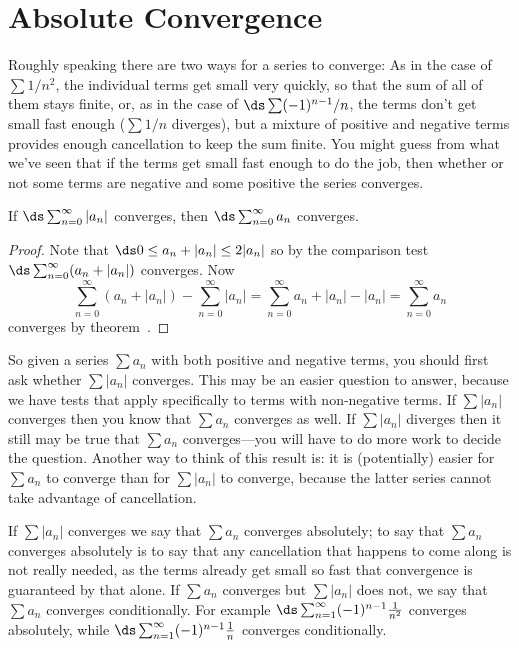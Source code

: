 \section{Absolute Convergence}{}{}
\nobreak
Roughly speaking there are two ways for a series to converge: As in
the case of $\sum 1/n^2$, the individual terms get small very quickly,
so that the sum of all of them stays finite, or, as in the case of
$\ds \sum (-1)^{n-1}/n$, the terms don't get small fast enough ($\sum 1/n$
diverges), but a mixture of positive and negative terms provides
enough cancellation to keep the sum finite. You might guess from what
we've seen that if the terms get small fast enough to do the job, then
whether or not some terms are negative and some positive the series
converges. 

\begin{theorem} If $\ds\sum_{n=0}^\infty |a_n|$ converges, then 
$\ds\sum_{n=0}^\infty a_n$ converges.
\begin{proof}
Note that $\ds 0\le a_n+|a_n|\le 2|a_n|$ so by the comparison test
$\ds\sum_{n=0}^\infty (a_n+|a_n|)$ converges. Now
$$
  \sum_{n=0}^\infty (a_n+|a_n|) -\sum_{n=0}^\infty |a_n|
  = \sum_{n=0}^\infty a_n+|a_n|-|a_n| = \sum_{n=0}^\infty a_n 
$$
converges by theorem~.
\end{proof}

So given a series $\sum a_n$ with both positive and negative terms,
you should first ask whether $\sum |a_n|$ converges. This may be an
easier question to answer, because we have tests that apply
specifically to terms with non-negative terms. If $\sum |a_n|$
converges then you know that $\sum a_n$ converges as well. If $\sum
|a_n|$ diverges then it still may be true that $\sum a_n$
converges---you will have to do more work to decide the question.
Another way to think of this result is: it is (potentially) easier for
$\sum a_n$ to converge than for $\sum |a_n|$ to converge, because the
latter series cannot take advantage of cancellation. 

If $\sum |a_n|$ converges we say that $\sum a_n$ converges {\dfont
absolutely\/}; to say that $\sum
a_n$ converges absolutely is to say that any cancellation that happens
to come along is not really needed, as the terms already get small so
fast that convergence is guaranteed by that alone. If $\sum a_n$
converges but $\sum |a_n|$ does not, we say that $\sum a_n$ converges
{\dfont conditionally}. For
example $\ds\sum_{n=1}^\infty (-1)^{n-1} {1\over n^2}$ converges
absolutely, while $\ds\sum_{n=1}^\infty (-1)^{n-1} {1\over n}$
converges conditionally.


\end{theorem}
